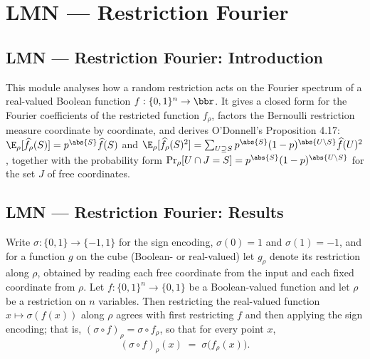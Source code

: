 \section{LMN --- Restriction Fourier}
\subsection*{LMN --- Restriction Fourier: Introduction}

This module analyses how a random restriction acts on the Fourier spectrum of a
real-valued Boolean function $f : \{0,1\}^n \to \bbr$. It gives a closed form for the
Fourier coefficients of the restricted function $f_\rho$, factors the Bernoulli
restriction measure coordinate by coordinate, and derives O'Donnell's Proposition 4.17:
$\E_\rho[\widehat{f_\rho}(S)] = p^{\abs{S}}\widehat{f}(S)$ and
$\E_\rho[\widehat{f_\rho}(S)^2] = \sum_{U \supseteq S} p^{\abs{S}}(1-p)^{\abs{U \setminus S}}\widehat{f}(U)^2$,
together with the probability form $\Pr_\rho[U \cap J = S] = p^{\abs{S}}(1-p)^{\abs{U\setminus S}}$
for the set $J$ of free coordinates.

\subsection*{LMN --- Restriction Fourier: Results}

\begin{definition}
\label{RestrictionFourier.restrictBF_boolToSign}
\leanok
{}
Write $\sigma\colon\{0,1\}\to\{-1,1\}$ for the sign encoding, $\sigma(0)=1$ and
$\sigma(1)=-1$, and for a function $g$ on the cube (Boolean- or real-valued) let
$g_\rho$ denote its restriction along $\rho$, obtained by reading each free coordinate
from the input and each fixed coordinate from $\rho$. Let $f\colon\{0,1\}^n\to\{0,1\}$
be a Boolean-valued function and let $\rho$ be a restriction on $n$ variables. Then
restricting the real-valued function $x\mapsto\sigma(f(x))$ along $\rho$ agrees with
first restricting $f$ and then applying the sign encoding; that is, $(\sigma\circ
f)_\rho=\sigma\circ f_\rho$, so that for every point $x$,
\[
  (\sigma\circ f)_\rho(x)\;=\;\sigma\big(f_\rho(x)\big).
\]
\end{definition}

